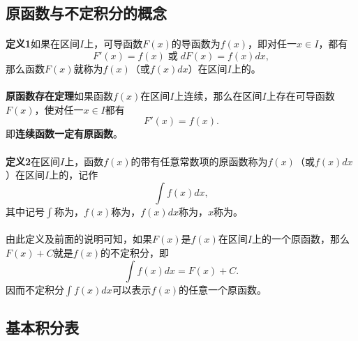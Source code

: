 \subsection{原函数与不定积分的概念}
\paragraph{}
\textbf{定义1\;}如果在区间$I$上，可导函数$F(x)$的导函数为$f(x)$，即对任一$x\in I$，都有
\begin{equation}
  F'(x) = f(x) \;\textbf{或}\; dF(x) = f(x)dx,
\end{equation}
那么函数$F(x)$就称为$f(x)$（或$f(x)dx$）在区间$I$上的。

\paragraph{}
\textbf{原函数存在定理\;}如果函数$f(x)$在区间$I$上连续，那么在区间$I$上存在可导函数$F(x)$，使对任一$x\in I$都有
\begin{equation*}
  F'(x) = f(x).
\end{equation*}
即\textbf{连续函数一定有原函数}。

\paragraph{}
\textbf{定义2\;}在区间$I$上，函数$f(x)$的带有任意常数项的原函数称为$f(x)$（或$f(x)dx$）在区间$I$上的，记作
\begin{equation}
  \int{f(x)dx},
\end{equation}
其中记号$\int$称为，$f(x)$称为，$f(x)dx$称为，$x$称为。

\paragraph{}
由此定义及前面的说明可知，如果$F(x)$是$f(x)$在区间$I$上的一个原函数，那么$F(x)+C$就是$f(x)$的不定积分，即
\begin{equation}
  \int{f(x)dx} = F(x) + C.
\end{equation}
因而不定积分$\int{f(x)dx}$可以表示$f(x)$的任意一个原函数。

\subsection{基本积分表}
\paragraph{}

